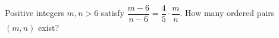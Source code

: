 Positive integers $m,n>6$ satisfy $\dfrac{m-6}{n-6}=\dfrac{4}{5}\cdot\dfrac{m}{n}$. How many ordered pairs $(m,n)$ exist?
